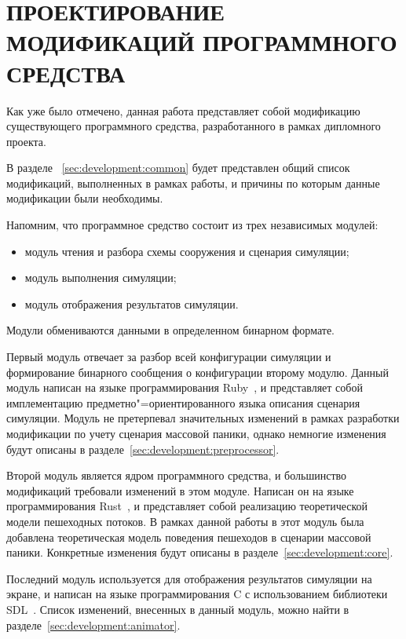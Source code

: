 \chapter{ПРОЕКТИРОВАНИЕ МОДИФИКАЦИЙ ПРОГРАММНОГО СРЕДСТВА} %
\label{sec:development}

Как уже было отмечено, данная работа представляет собой модификацию существующего программного средства, разработанного в рамках дипломного проекта.

В разделе ~\ref{sec:development:common} будет представлен общий список модификаций, выполненных в рамках работы,
и причины по которым данные модификации были необходимы.

Напомним, что программное средство состоит из трех независимых модулей:

\begin{itemize}
  \item модуль чтения и разбора схемы сооружения и сценария симуляции;
  \item модуль выполнения симуляции;
  \item модуль отображения результатов симуляции.
\end{itemize}

Модули обмениваются данными в определенном бинарном формате.

Первый модуль отвечает за разбор всей конфигурации симуляции и формирование бинарного сообщения о конфигурации второму модулю.
Данный модуль написан на языке программирования Ruby~\cite{ruby_doc}, и представляет собой имплементацию предметно"=ориентированного языка описания сценария симуляции.
Модуль не претерпевал значительных изменений в рамках разработки модификации по учету сценария массовой паники,
однако немногие изменения будут описаны в разделе~\ref{sec:development:preprocessor}.

Второй модуль является ядром программного средства, и большинство модификаций требовали изменений в этом модуле.
Написан он на языке программирования Rust~\cite{rust_doc}, и представляет собой реализацию теоретической модели пешеходных потоков.
В рамках данной работы в этот модуль была добавлена теоретическая модель поведения пешеходов в сценарии массовой паники.
Конкретные изменения будут описаны в разделе~\ref{sec:development:core}.

Последний модуль используется для отображения результатов симуляции на экране,
и написан на языке программирования C с использованием библиотеки SDL~\cite{libsdl_home}.
Список изменений, внесенных в данный модуль, можно найти в разделе~\ref{sec:development:animator}.

